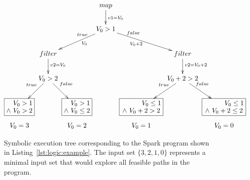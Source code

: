 \begin{figure}[t]
	\[\xymatrix@C=0.3em @R=0.8em{ 
		& & & \ar[dd]^<(0.4){v1 = V_{0}} map & & & & \\
		& & & & & & & \\
		& & & \ar@{}[lldd]_<(0.2){true} \ar@{}[lldd]^>(0.5){V_{0}} \ar[lldd] V_{0} > 1 \ar[rrdd] \ar@{}[rrdd]_>(0.5){V_{0} + 2} \ar@{}[rrdd]^<(0.2){false} & & & & \\
		& & & & & & & \\
		& \ar[dd]^<(0.3){v2 = V_{0}} filter & & & & \ar[dd]^<(0.3){v2 = V_{0} + 2} filter & \\
		& & & & & & & \\
		& \ar@{}[ldd]_<(0.2){true} \ar[ldd] V_{0} > 2 \ar[rdd] \ar@{}[rdd]^<(0.2){false} & & & & \ar@{}[ldd]_<(0.2){true} \ar[ldd] V_{0} + 2 > 2 \ar[rdd] \ar@{}[rdd]^<(0.2){false} & \\
		& & & & & & & \\
		*+[F] \txt{$~~~V_{0} > 1$ 
			\\ $\land ~V_{0} > 2$} & & 
		*+[F] \txt{$~~~V_{0} > 1$ 
			\\ $\land ~V_{0} \leq 2$} & &
		*+[F] \txt{$~~~~~~~~~V_{0} \leq 1$ 
			\\ $\land ~V_{0} + 2 > 2$} & &
		*+[F] \txt{$~~~~~~~~~V_{0} \leq 1$ 
			\\ $\land ~V_{0} + 2 \leq 2$} \\
		V_{0} = 3 & & V_{0} = 2 & & V_{0} = 1 & & V_{0} = 0 & 
	} \]
	\caption[Symbolic Execution Tree of a Trivial Spark Program]{Symbolic execution tree corresponding to the Spark program shown in Listing~\ref{lst:logic:example}. The input set $\{3,2,1,0\}$ represents a minimal input set that would explore all feasible paths in the program.}
	\label{fig:logic:symbolic-spark-example}
\end{figure}
